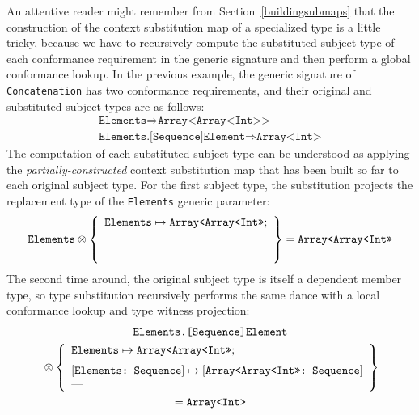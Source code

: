 \documentclass[../generics]{subfiles}
\begin{document}
\begin{example}
An attentive reader might remember from Section~\ref{buildingsubmaps} that the construction of the context substitution map of a specialized type is a little tricky, because we have to recursively compute the substituted subject type of each conformance requirement in the generic signature and then perform a global conformance lookup. In the previous example, the generic signature of \texttt{Concatenation} has two conformance requirements, and their original and substituted subject types are as follows:
\begin{gather*}
\texttt{Elements} \Rightarrow \texttt{Array<Array<Int>>}\\
\texttt{Elements.[Sequence]Element} \Rightarrow \texttt{Array<Int>}
\end{gather*}
The computation of each substituted subject type can be understood as applying the \emph{partially-constructed} context substitution map that has been built so far to each original subject type. For the first subject type, the substitution projects the replacement type of the \texttt{Elements} generic parameter:
\[
\texttt{Elements} \otimes \SubstMapLongC{
\SubstType{Elements}{Array<Array<Int>>}
}{
\text{---}\\
\text{---}
} = \texttt{Array<Array<Int>>}
\]
The second time around, the original subject type is itself a dependent member type, so type substitution recursively performs the same dance with a local conformance lookup and type witness projection:
\begin{gather*}
\texttt{Elements.[Sequence]Element} \\
{} \otimes \SubstMapLongC{
\SubstType{Elements}{Array<Array<Int>>}
}{
\SubstConf{Elements}{Array<Array<Int>>}{Sequence}\\
\text{---}
}\\
= \texttt{Array<Int>}
\end{gather*}
\end{example}
\end{document}
